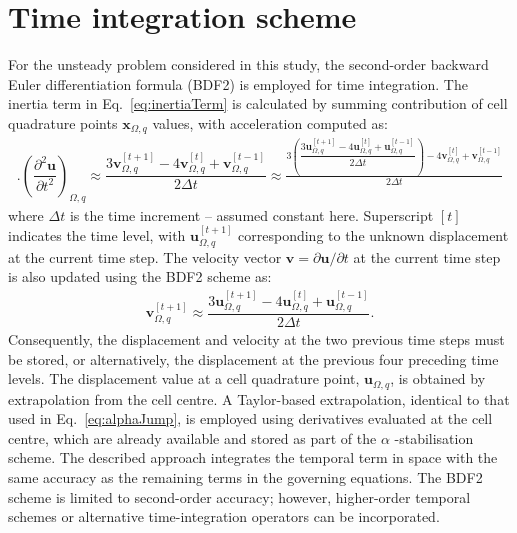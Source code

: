 \documentclass[review,3p]{elsarticle}
\newcommand{\bb}{\boldsymbol}
\begin{document}
\section{Time integration scheme}
\label{app:time}
%
%
For the unsteady problem considered in this study, the second-order backward Euler differentiation formula (BDF2) is employed for time integration. The inertia term in Eq.~\eqref{eq:inertiaTerm} is calculated by summing contribution of cell quadrature points $\bb{x}_{\Omega, q}$ values, with acceleration computed as:
%
\begin{eqnarray} \label{eq:inertia2}. 	\left(\dfrac{\partial^2 \boldsymbol{u}}{\partial t^2}\right)_{\Omega, q}
	\approx
	\dfrac{3\boldsymbol{v}_{\Omega, q}^{[t+1]} - 4\boldsymbol{v}_{\Omega, q}^{[t]} + \boldsymbol{v}_{\Omega, q}^{[t-1]}}{2\Delta t}
	\approx
	\frac{3\left(
		\dfrac{3\boldsymbol{u}_{\Omega, q}^{[t+1]} - 4\boldsymbol{u}_{\Omega, q}^{[t]} + \boldsymbol{u}_{\Omega, q}^{[t-1]}}{2\Delta t}
		\right)
		- 4\boldsymbol{v}_{\Omega, q}^{[t]} + \boldsymbol{v}_{\Omega, q}^{[t-1]}}{2\Delta t}
\end{eqnarray}
%
where $\Delta t$ is the time increment -- assumed constant here.
Superscript $[t]$ indicates the time level, with $\bb{u}_{\Omega, q}^{[t+1]}$ corresponding to the unknown displacement at the current time step.
The velocity vector $\bb{v} = \partial \bb{u}/\partial t$ at the current time step is also updated using the BDF2 scheme as:
%
\begin{eqnarray}
	\boldsymbol{v}_{\Omega, q}^{[t+1]}	\approx
	\dfrac{3\boldsymbol{u}_{\Omega, q}^{[t+1]} - 4\boldsymbol{u}_{\Omega, q}^{[t]} + \boldsymbol{u}_{\Omega, q}^{[t-1]}}{2\Delta t}.
\end{eqnarray}
%
Consequently, the displacement and velocity at the two previous time steps must be stored, or alternatively, the displacement at the previous  four preceding time levels.
The displacement value at a cell quadrature point, $\boldsymbol{u}_{\Omega,q}$, is obtained by extrapolation from the cell centre. A Taylor-based extrapolation, identical to that used in Eq.~\eqref{eq:alphaJump}, is employed using derivatives evaluated at the cell centre, which are already available and stored as part of the $\alpha$ -stabilisation scheme. 
The described approach integrates the temporal term in space with the same accuracy as the remaining terms in the governing equations. The BDF2 scheme is limited to second-order accuracy; however, higher-order temporal schemes or alternative time-integration operators \cite{Costa2022b} can be incorporated.
%
%
\end{document}
